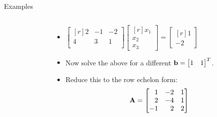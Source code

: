 \documentclass[aspectratio=169]{beamer}
\def\mf{\ensuremath\mathbf}
\begin{document}
\begin{frame}[t]{Examples}
\begin{small}
\begin{columns}[t]
\begin{column}{0.5\textwidth}
\begin{itemize}
\end{itemize}
\end{column}
\begin{column}{0.5\textwidth}
\begin{itemize}
    \item $\begin{bmatrix*}[r]
    2 & -1 & -2 \\
    4 & 3 & 1\\
    \end{bmatrix*} \begin{bmatrix*}[r]x_1\\x_2\\x_3\end{bmatrix*} = \begin{bmatrix*}[r]1\\-2\end{bmatrix*}$

    \item Now solve the above for a different $\mf{b} = \begin{bmatrix*}[r]1 & 1\end{bmatrix*}^T$.

    \item Reduce this to the row echelon form:
    $$\mf{A} = \begin{bmatrix*}[r]
    1 & -2 & 1 \\
    2 & -4 & 1 \\
    -1 & 2 & 2 \\
    \end{bmatrix*}$$
\end{itemize}
\end{column}
\end{columns}
\end{small}
\end{frame}
\end{document}

